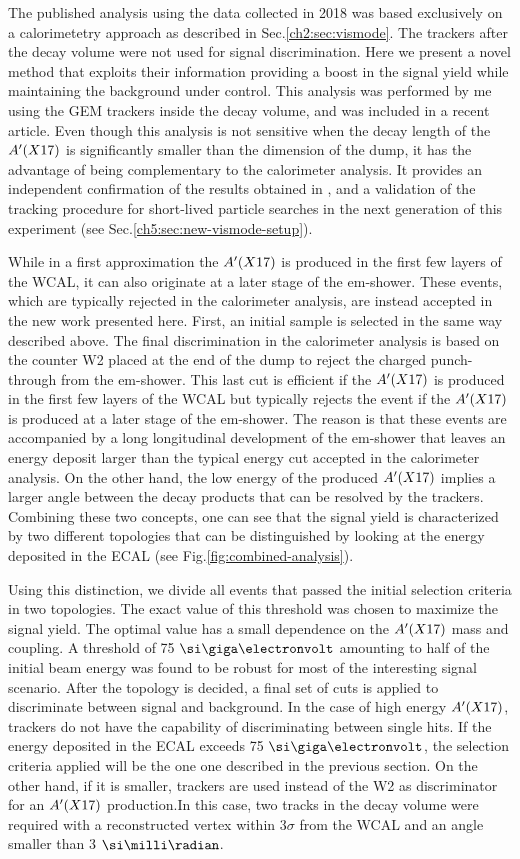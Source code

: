 The published analysis using the data collected in 2018 \cite{Banerjee:2019hmi} was based exclusively on a calorimetetry approach as described in Sec.\ref{ch2:sec:vismode}. The trackers after the decay volume were not used for signal discrimination. Here we present a novel method that exploits their information providing a boost in the signal yield while maintaining the background under control. This analysis was performed by me using the GEM trackers inside the decay volume, and was included in a recent article. Even though this analysis is not sensitive when the decay length of the $A'(X17)$ is significantly smaller than the dimension of the dump, it has the advantage of being complementary to the calorimeter analysis. It provides an independent confirmation of the results obtained in \cite{Banerjee:2019hmi}, and a validation of the tracking procedure for short-lived particle searches in the next generation of this experiment (see Sec.\ref{ch5:sec:new-vismode-setup}).

While in a first approximation the $A'(X17)$ is produced in the first few layers of the WCAL, it can also originate at a later stage of the em-shower. These events, which are typically rejected in the calorimeter analysis, are instead accepted in the new work presented here. First, an initial sample is selected in the same way described above. The final discrimination in the calorimeter analysis is based on the counter W2 placed at the end of the dump to reject the charged punch-through from the em-shower. This last cut is efficient if the $A'(X17)$ is produced in the first few layers of the WCAL but typically rejects the event if the $A'(X17)$ is produced at a later stage of the em-shower. The reason is that these events are accompanied by a long longitudinal development of the em-shower that leaves an energy deposit larger than the typical energy cut accepted in the calorimeter analysis. On the other hand, the low energy of the produced $A'(X17)$ implies a larger angle between the decay products that can be resolved by the trackers. Combining these two concepts, one can see that the signal yield is characterized by two different topologies that can be distinguished by looking at the energy deposited in the ECAL (see Fig.\ref{fig:combined-analysis}).

Using this distinction, we divide all events that passed the initial selection criteria in two topologies.
The exact value of this threshold was chosen to maximize the signal yield. The optimal value has a small dependence on the $A'(X17)$ mass and coupling. A threshold of 75 $\gev$ amounting to half of the initial beam energy was found to be robust for most of the interesting signal scenario. After the topology is decided, a final set of cuts is applied to discriminate between signal and background. In the case of high energy $A'(X17)$, trackers do not have the capability of discriminating between single hits. If the energy deposited in the ECAL exceeds 75 $\gev$, the selection criteria applied will be the one one described in the previous section. On the other hand, if it is smaller, trackers are used instead of the W2 as discriminator for an $A'(X17)$ production.In this case, two tracks in the decay volume were required with a reconstructed vertex within 3$\sigma$ from the WCAL and an angle smaller than 3 $\mrad$.

